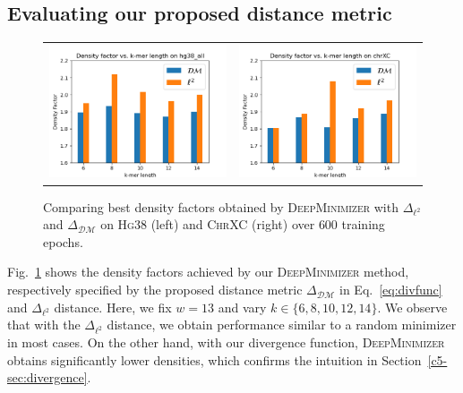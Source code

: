 \subsection{Evaluating our proposed distance metric}  
\begin{figure}[h]
\begin{tabular}{cc}
\includegraphics[width=0.46\columnwidth]{minimizer_plots/compare_divfunc_hg38_all.png} &
\includegraphics[width=0.46\columnwidth]{minimizer_plots/compare_divfunc_chrXC.png}
\end{tabular}    
\caption{Comparing best density factors obtained by \textsc{DeepMinimizer} with $\Delta_{\ell^2}$ and $\Delta_{\mathcal{DM}}$ on \textsc{Hg38} (left) and \textsc{ChrXC} (right) over $600$ training epochs.}
\label{app-msd-fig:1b}
\end{figure}

\noindent Fig.~\ref{app-msd-fig:1b} shows the density factors achieved by our \textsc{DeepMinimizer} method, respectively specified by the proposed distance metric $\Delta_{\mathcal{DM}}$ in Eq.~\ref{eq:divfunc} and $\Delta_{\ell^2}$ distance. Here, we fix $w=13$ and vary $k \in \{6,8,10,12,14\}$. We observe that with the $\Delta_{\ell^2}$ distance, we obtain performance similar to a random minimizer in most cases. On the other hand, with our divergence function, \textsc{DeepMinimizer} obtains significantly lower densities, which confirms the intuition in Section~\ref{c5-sec:divergence}.

